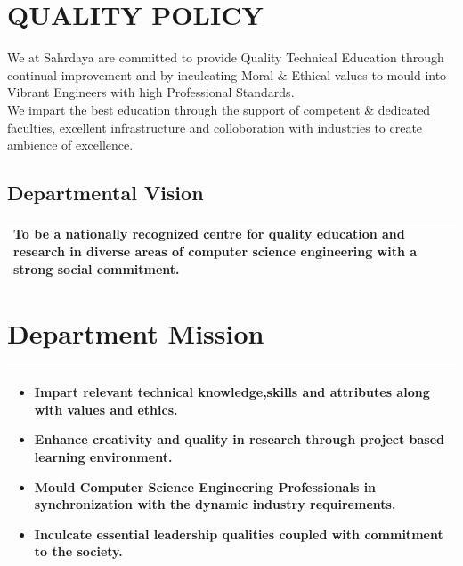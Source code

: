\documentclass[12pt,a4paper]{report}
\begin{document}
\section*{\hfil\normalsize{\textbf{QUALITY POLICY}}\hfil}
We at Sahrdaya are committed to provide Quality Technical Education through continual improvement and by inculcating Moral \& Ethical values to mould into Vibrant Engineers with high Professional Standards.\\

We impart the best education through the support of competent \& dedicated faculties, excellent infrastructure and colloboration with industries to create ambience of excellence.
\newpage
\pagestyle{plain}

\begin{center}

\section*{\normalsize{\textbf{Departmental Vision}}}

\end{center}
\doublespacing
\begin{longtable}{| p{} |}
\hline
To be a nationally recognized centre for quality education and research in diverse
areas of computer science engineering with a strong social commitment.
\\
\hline

\end{longtable}

\section*{\hfil\normalsize{\textbf{Department Mission}}\hfil}

\begin{longtable}{| p{} |}
\hline
\begin{itemize}
\item Impart relevant technical knowledge,skills and attributes along with values and ethics.
\item Enhance creativity and quality in research through project based learning environment.
\item Mould Computer Science Engineering Professionals in synchronization with the dynamic industry requirements.
\item Inculcate essential leadership qualities coupled with commitment to the society.

\end{itemize}
\\
\hline

\end{longtable}
\end{document}
